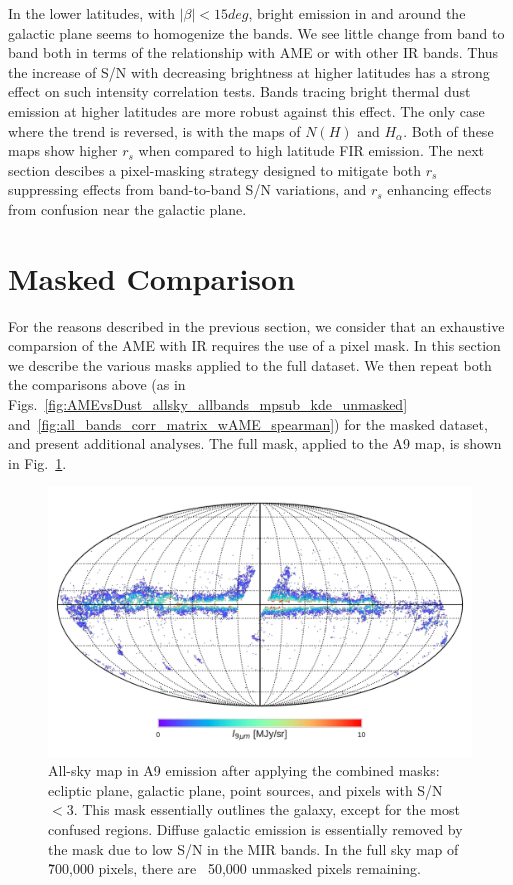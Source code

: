         In the lower latitudes, with $|\beta| < 15deg$, bright emission in and around the galactic plane seems to homogenize the bands. We see little change from band to band both in terms of the relationship with AME or with other IR bands. Thus the increase of S/N with decreasing brightness at higher latitudes has a strong effect on such intensity correlation tests. Bands tracing bright thermal dust emission at higher latitudes are more robust against this effect. The only case where the trend is reversed, is with the maps of $N(H)$ and $H_{\alpha}$. Both of these maps show higher $r_{s}$ when compared to high latitude FIR emission. The next section descibes a pixel-masking strategy designed to mitigate both $r_{s}$ suppressing effects from band-to-band S/N variations, and $r_{s}$ enhancing effects from confusion near the galactic plane.

      \section{Masked Comparison}
        For the reasons described in the previous section, we consider that an exhaustive comparsion of the AME with IR requires the use of a pixel mask. In this section we describe the various masks applied to the full dataset. We then repeat both the comparisons above (as in  Figs.~\ref{fig:AMEvsDust_allsky_allbands_mpsub_kde_unmasked} and~\ref{fig:all_bands_corr_matrix_wAME_spearman}) for the masked dataset, and present additional analyses. The full mask, applied to the A9 map, is shown in Fig.~\ref{fig:A9_masked_map}.
          \begin{figure}
            \includegraphics[width=\textwidth]{../Plots/ch_allsky/masked_map_A9.pdf}
            \centering
            \caption{All-sky map in A9 emission after applying the combined masks: ecliptic plane, galactic plane, point sources, and pixels with S/N $<3$. This mask essentially outlines the galaxy, except for the most confused regions. Diffuse galactic emission is essentially removed by the mask due to low S/N in the MIR bands. In the full sky map of \~700,000 pixels, there are ~50,000 unmasked pixels remaining.}
            \label{fig:A9_masked_map}
          \end{figure}

